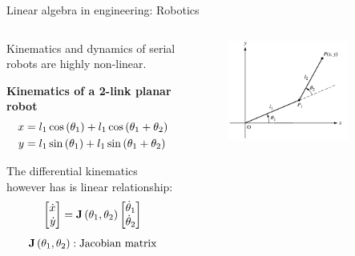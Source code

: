 \documentclass[aspectratio=169]{beamer}
\def\mf{\ensuremath\mathbf}
\def\lp{\ensuremath\left(}
\def\rp{\ensuremath\right)}
\def\bmx{\ensuremath\begin{bmatrix*}[r]}
\def\emx{\ensuremath\end{bmatrix*}}
\newcommand{\ct}[1]{\lp #1\rp}
\begin{document}
\begin{frame}{Linear algebra in engineering: Robotics}
  \begin{columns}
    \begin{column}{0.5\textwidth}
      Kinematics and dynamics of serial robots are highly non-linear.

      \textbf{Kinematics of a 2-link planar robot}
      \[ 
        \begin{split}
          x &= l_1 \cos\ct{\theta_1} + l_1 \cos\ct{\theta_1 + \theta_2} \\
          y &= l_1 \sin\ct{\theta_1} + l_1 \sin\ct{\theta_1 + \theta_2} \\
        \end{split}
      \]

      The differential kinematics however has is linear relationship:
      \[ \bmx \dot{x} \\ \dot{y}\emx = \mf{J}\ct{\theta_1, \theta_2} \bmx \dot{\theta}_1 \\ \dot{\theta}_2 \emx \]
      \[ \mf{J}\ct{\theta_1, \theta_2}: \text{Jacobian matrix} \]
    \end{column}
    \begin{column}{0.45\textwidth}
      \begin{figure}
        \centering
        \includegraphics[width=0.8\textwidth]{2links.png}
      \end{figure}
    \end{column}    
  \end{columns}
\end{frame}
\end{document}
